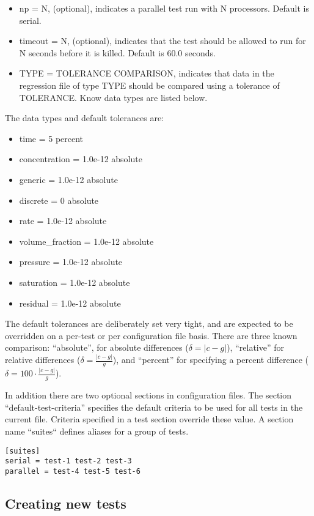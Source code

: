 \begin{itemize}
\item np = N, (optional), indicates a parallel test run with N processors. Default is serial.
\item timeout = N, (optional), indicates that the test should be allowed to run
  for N seconds before it is killed. Default is 60.0 seconds.
\item TYPE = TOLERANCE COMPARISON, indicates that data in the
  regression file of type TYPE should be compared using a tolerance of
  TOLERANCE. Know data types are listed below.
\end{itemize}

The data types and default tolerances are:
\begin{itemize}
\item time = 5 percent
\item concentration = 1.0e-12 absolute
\item generic = 1.0e-12 absolute
\item discrete = 0 absolute
\item rate = 1.0e-12 absolute
\item volume\_fraction = 1.0e-12 absolute
\item pressure = 1.0e-12 absolute
\item saturation = 1.0e-12 absolute
\item residual = 1.0e-12 absolute
\end{itemize}
The default tolerances are deliberately set very tight, and are
expected to be overridden on a per-test or per configuration file
basis.  There are three known comparison: ``absolute'', for absolute
differences ($\delta=|c-g|$), ``relative'' for relative differences ($\delta=\frac{|c-g|}{g}$), and ``percent''
for specifying a percent difference ($\delta=100\cdot\frac{|c-g|}{g}$).

In addition there are two optional sections in configuration
files. The section ``default-test-criteria'' specifies the default
criteria to be used for all tests in the current file. Criteria
specified in a test section override these value. A section name
``suites`` defines aliases for a group of tests.
\begin{verbatim}
[suites]
serial = test-1 test-2 test-3
parallel = test-4 test-5 test-6
\end{verbatim}

\subsection{Creating new tests}

